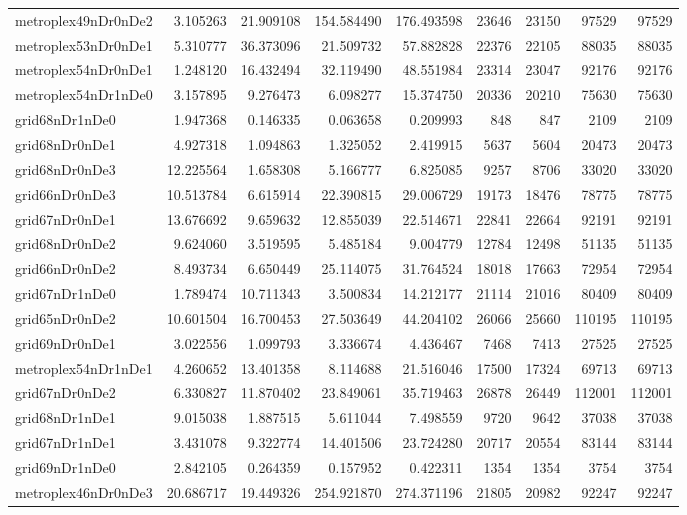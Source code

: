\begin{longtable}{|l|r|r|r|r|r|r|r|r|}
metroplex49nDr0nDe2 & 3.105263 & 21.909108 & 154.584490 & 176.493598 & 23646 & 23150 & 97529 & 97529 \\
metroplex53nDr0nDe1 & 5.310777 & 36.373096 & 21.509732 & 57.882828 & 22376 & 22105 & 88035 & 88035 \\
metroplex54nDr0nDe1 & 1.248120 & 16.432494 & 32.119490 & 48.551984 & 23314 & 23047 & 92176 & 92176 \\
metroplex54nDr1nDe0 & 3.157895 & 9.276473 & 6.098277 & 15.374750 & 20336 & 20210 & 75630 & 75630 \\
grid68nDr1nDe0 & 1.947368 & 0.146335 & 0.063658 & 0.209993 & 848 & 847 & 2109 & 2109 \\
grid68nDr0nDe1 & 4.927318 & 1.094863 & 1.325052 & 2.419915 & 5637 & 5604 & 20473 & 20473 \\
grid68nDr0nDe3 & 12.225564 & 1.658308 & 5.166777 & 6.825085 & 9257 & 8706 & 33020 & 33020 \\
grid66nDr0nDe3 & 10.513784 & 6.615914 & 22.390815 & 29.006729 & 19173 & 18476 & 78775 & 78775 \\
grid67nDr0nDe1 & 13.676692 & 9.659632 & 12.855039 & 22.514671 & 22841 & 22664 & 92191 & 92191 \\
grid68nDr0nDe2 & 9.624060 & 3.519595 & 5.485184 & 9.004779 & 12784 & 12498 & 51135 & 51135 \\
grid66nDr0nDe2 & 8.493734 & 6.650449 & 25.114075 & 31.764524 & 18018 & 17663 & 72954 & 72954 \\
grid67nDr1nDe0 & 1.789474 & 10.711343 & 3.500834 & 14.212177 & 21114 & 21016 & 80409 & 80409 \\
grid65nDr0nDe2 & 10.601504 & 16.700453 & 27.503649 & 44.204102 & 26066 & 25660 & 110195 & 110195 \\
grid69nDr0nDe1 & 3.022556 & 1.099793 & 3.336674 & 4.436467 & 7468 & 7413 & 27525 & 27525 \\
metroplex54nDr1nDe1 & 4.260652 & 13.401358 & 8.114688 & 21.516046 & 17500 & 17324 & 69713 & 69713 \\
grid67nDr0nDe2 & 6.330827 & 11.870402 & 23.849061 & 35.719463 & 26878 & 26449 & 112001 & 112001 \\
grid68nDr1nDe1 & 9.015038 & 1.887515 & 5.611044 & 7.498559 & 9720 & 9642 & 37038 & 37038 \\
grid67nDr1nDe1 & 3.431078 & 9.322774 & 14.401506 & 23.724280 & 20717 & 20554 & 83144 & 83144 \\
grid69nDr1nDe0 & 2.842105 & 0.264359 & 0.157952 & 0.422311 & 1354 & 1354 & 3754 & 3754 \\
metroplex46nDr0nDe3 & 20.686717 & 19.449326 & 254.921870 & 274.371196 & 21805 & 20982 & 92247 & 92247 \\

\end{longtable}

